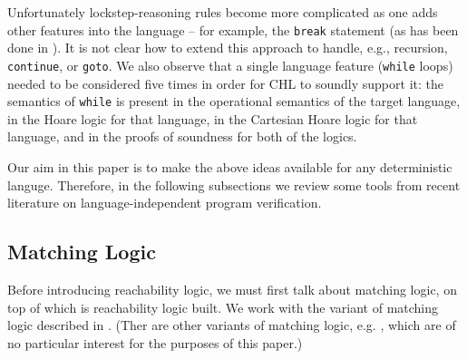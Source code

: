 
Unfortunately lockstep-reasoning rules become more complicated as one adds other features into the language
-- for example, the \texttt{break} statement (as has been done in \cite{SousaD16}).
It is not clear how to extend this approach to handle, e.g., recursion, \texttt{continue}, or \texttt{goto}.
We also observe that a single language feature (\texttt{while} loops) needed to be considered five times
in order for CHL to soundly support it: the semantics of \texttt{while} is present in the operational semantics of
the target language, in the Hoare logic for that language, in the Cartesian Hoare logic for that language,
and in the proofs of soundness for both of the logics.

Our aim in this paper is to make the above ideas available for any deterministic languge.
Therefore, in the following subsections we review some tools from recent literature
on language-independent program verification.

\subsection{Matching Logic}

Before introducing reachability logic, we must first talk about matching
logic, on top of which is reachability logic built. We work with the variant of matching logic described in
\cite{StefanescuCMMSR19, RosuSCM13lics}. (Ther are other variants of matching
logic, e.g. \cite{MmL, MLexplained}, which are of no particular interest for
the purposes of this paper.)



